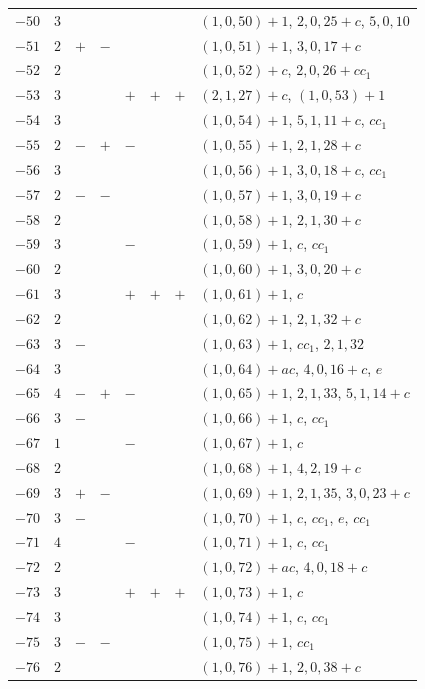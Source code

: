 \documentclass[11pt,a4paper]{article}
\begin{document}
\begin{longtable}{r|r|ccccc|>{\raggedright\arraybackslash}p{4.5cm}}
$-50$ & $3$ & & & & & & $(1,0,50)+1$, $2,0,25+c$, $5,0,10$ \\
$-51$ & $2$ & $+$ & $-$ & & & & $(1,0,51)+1$, $3,0,17+c$ \\
$-52$ & $2$ & & & & & & $(1,0,52)+c$, $2,0,26+cc_1$ \\
$-53$ & $3$ & & & $+$ & $+$ & $+$ & $(2,1,27)+c$, $(1,0,53)+1$ \\
$-54$ & $3$ & & & & & & $(1,0,54)+1$, $5,1,11+c$, $cc_1$ \\
$-55$ & $2$ & $-$ & $+$ & $-$ & & & $(1,0,55)+1$, $2,1,28+c$ \\
$-56$ & $3$ & & & & & & $(1,0,56)+1$, $3,0,18+c$, $cc_1$ \\
$-57$ & $2$ & $-$ & $-$ & & & & $(1,0,57)+1$, $3,0,19+c$ \\
$-58$ & $2$ & & & & & & $(1,0,58)+1$, $2,1,30+c$ \\
$-59$ & $3$ & & & $-$ & & & $(1,0,59)+1$, $c$, $cc_1$ \\
$-60$ & $2$ & & & & & & $(1,0,60)+1$, $3,0,20+c$ \\
$-61$ & $3$ & & & $+$ & $+$ & $+$ & $(1,0,61)+1$, $c$ \\
$-62$ & $2$ & & & & & & $(1,0,62)+1$, $2,1,32+c$ \\
$-63$ & $3$ & $-$ & & & & & $(1,0,63)+1$, $cc_1$, $2,1,32$ \\
$-64$ & $3$ & & & & & & $(1,0,64)+ac$, $4,0,16+c$, $e$ \\
$-65$ & $4$ & $-$ & $+$ & $-$ & & & $(1,0,65)+1$, $2,1,33$, $5,1,14+c$ \\
$-66$ & $3$ & $-$ & & & & & $(1,0,66)+1$, $c$, $cc_1$ \\
$-67$ & $1$ & & & $-$ & & & $(1,0,67)+1$, $c$ \\
$-68$ & $2$ & & & & & & $(1,0,68)+1$, $4,2,19+c$ \\
$-69$ & $3$ & $+$ & $-$ & & & & $(1,0,69)+1$, $2,1,35$, $3,0,23+c$ \\
$-70$ & $3$ & $-$ & & & & & $(1,0,70)+1$, $c$, $cc_1$, $e$, $cc_1$ \\
$-71$ & $4$ & & & $-$ & & & $(1,0,71)+1$, $c$, $cc_1$ \\
$-72$ & $2$ & & & & & & $(1,0,72)+ac$, $4,0,18+c$ \\
$-73$ & $3$ & & & $+$ & $+$ & $+$ & $(1,0,73)+1$, $c$ \\
$-74$ & $3$ & & & & & & $(1,0,74)+1$, $c$, $cc_1$ \\
$-75$ & $3$ & $-$ & $-$ & & & & $(1,0,75)+1$, $cc_1$ \\
$-76$ & $2$ & & & & & & $(1,0,76)+1$, $2,0,38+c$ \\

\end{longtable}
\end{document}
